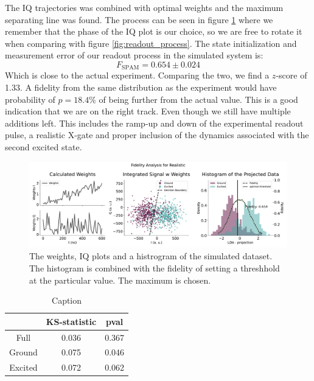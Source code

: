 The IQ trajectories was combined with optimal weights and the maximum separating line was found. The process can be seen in figure \ref{fig:simulation_readout} where we remember that the phase of the IQ plot is our choice, so we are free to rotate it when comparing with figure \ref{fig:readout_process}. The state initialization and measurement error of our readout process in the simulated system is:
\begin{equation}
    F_{\text{SPAM}} = 0.654 \pm 0.024
\end{equation}
Which is close to the actual experiment. Comparing the two, we find a $z$-score of 1.33. A fidelity from the same distribution as the experiment would have probability of  $p = 18.4 \%$ of being further from the actual value. This is a good indication that we are on the right track. Even though we still have multiple additions left. This includes the ramp-up and down of the experimental readout pulse, a realistic X-gate and proper inclusion of the dynamics associated with the second excited state. 
\begin{figure}[t]
    \centering
    \includegraphics[]{Simulations/budgets/figures/realistic_sme.pdf}
    \caption{The weights, IQ plots and a histrogram of the simulated dataset. The histogram is combined with the fidelity of setting a threshhold at the particular value. The maximum is chosen.}
    \label{fig:simulation_readout}
\end{figure}


\begin{table}[h]
    \centering
    \begin{tabular}{c|cc}
                & KS-statistic & pval  \\ \hline
    Full        & 0.036 & 0.367         \\
    Ground      & 0.075 & 0.046         \\
    Excited     & 0.072 & 0.062
    \end{tabular}
    \caption{Caption}
    \label{tab:my_label}
\end{table}

